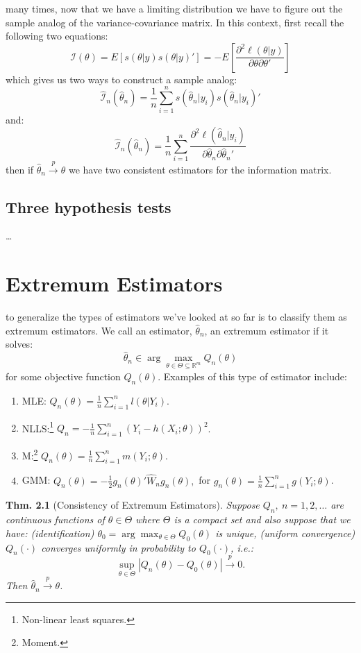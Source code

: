 \documentclass{tufte-book}
\theoremstyle{mytheoremstyle}
\newtheorem*{thm}{Thm.}
\theoremstyle{mylemstyle}
\theoremstyle{mydefstyle}
\begin{document}
 many times, now that we have a limiting distribution we have to figure out the sample analog of the variance-covariance matrix. In this context, first recall the following two equations:
	\[\mathcal{I}(\theta) = E[s(\theta | y) s(\theta | y)'] = -E\left[\frac{\partial^2 \ell(\theta | y)}{\partial \theta \partial \theta'} \right]\]
which gives us two ways to construct a sample analog:
	\[\hat{\mathcal{I}}_n(\hat{\theta}_n) = \frac{1}{n}\sum_{i=1}^n s(\hat{\theta}_n | y_i)s(\hat{\theta}_n| y_i)'\]
and:
	\[\hat{\mathcal{I}}_n(\hat{\theta}_n) = \frac{1}{n}\sum_{i=1}^n \frac{\partial^2 \ell(\hat{\theta}_n | y_i)}{\partial \hat{\theta}_n \partial \hat{\theta}_n'} \]
then if \(\hat{\theta}_n \overset{p}{\rightarrow} \theta\) we have two consistent estimators for the information matrix. 

\section{Three hypothesis tests}
\dots

\chapter{Extremum Estimators}
 to generalize the types of estimators we've looked at so far is to classify them as extremum estimators. We call an estimator, \(\hat{\theta}_n\), an extremum estimator if it solves:
	\[\hat{\theta}_n \in \arg \max_{\theta \in \Theta \subseteq \mathbb{R}^m} Q_n (\theta)\]
for some objective function \(Q_n(\theta)\). Examples of this type of estimator include:
	\begin{enumerate}
		\item MLE: \(Q_n(\theta) = \frac{1}{n} \sum_{i=1}^n l(\theta | Y_i)\).
		\item NLLS:\footnote{Non-linear least squares.} \(Q_n = -\frac{1}{n} \sum_{i=1}^n (Y_i - h(X_i; \theta))^2 \).
		\item M:\footnote{Moment.} \(Q_n(\theta) = \frac{1}{n} \sum_{i=1}^n m(Y_i; \theta)\).
		\item GMM: \(Q_n(\theta) = -\frac{1}{2}g_n(\theta)'\hat{W}_n g_n(\theta),\) for \(g_n(\theta) = \frac{1}{n}\sum_{i=1}^n g(Y_i; \theta)\).
	\end{enumerate}
\begin{thm}[Consistency of Extremum Estimators] Suppose \(Q_n,\ n=1,2, \dots\) are continuous functions of \(\theta \in \Theta\) where \(\Theta\) is a compact set and also suppose that we have: (identification) \(\theta_0 = \arg \max_{\theta \in \Theta} Q_0(\theta)\) is unique, (uniform convergence) \(Q_n(\cdot)\) converges uniformly in probability to \(Q_0(\cdot)\), i.e.:
	\[\sup_{\theta \in \Theta} |Q_n(\theta) - Q_0(\theta)| \overset{p}{\rightarrow} 0 \text{.}\]
Then \(\hat{\theta}_n \overset{p}{\rightarrow} \theta\). 
\end{thm}
\end{document}

